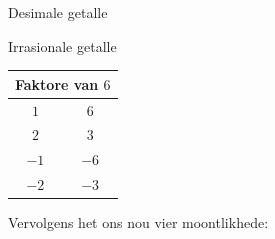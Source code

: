 \begin{Aktiwiteit}{Desimale getalle}
\begin{aktiwiteit}{Irrasionale getalle}
\begin{table}[H]
\begin{center}
\begin{tabular}[t]{|c|c|}\hline
\multicolumn{2}{|c|}{Faktore van $6$}
\\ \hline
$1$ &
$6$%
\\ \hline
$2$ &
$3$%
\\ \hline
$-1$ &
$-6$%
\\ \hline
$-2$ &
$-3$%
\\ \hline
\end{tabular}
\end{center}
\end{table}
\par
\label{m39394*id276096}Vervolgens het ons nou vier moontlikhede:\par 
\begin{table}[H]
\begin{center}
\label{m39394*id276099}
\noindent


\end{center}
\end{table}
\end{aktiwiteit}
\end{Aktiwiteit}
